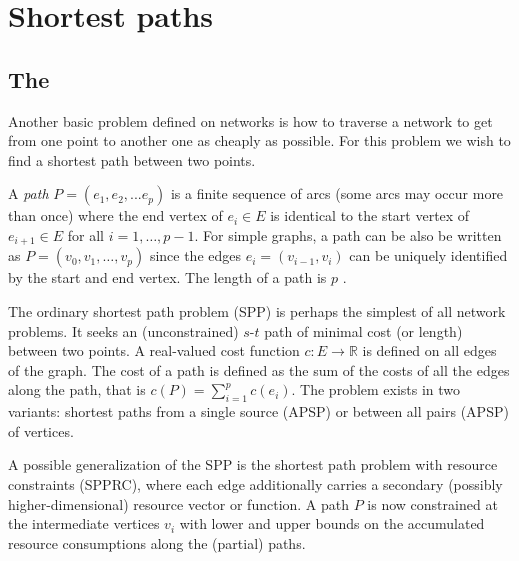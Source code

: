 \chapter{Shortest paths}\label{ch:4}

\section{The \spprc{}}
Another basic problem defined on networks is how to traverse a network to get from one point to another one as cheaply as possible. For this problem we wish to find a shortest path between two points.

\begin{definition}[path]
A \textit{path} $P = (e_1, e_2, ... e_p)$ is a finite sequence of arcs (some arcs may occur more than once) where the end vertex of $e_i \in E$ is identical to the start vertex of $e_{i+1} \in E$ for all $i=1,\dots,p-1$. For simple graphs, a path can be also be written as $P = (v_0,v_1,\dots,v_p)$ since the edges $e_i=(v_{i-1},v_i)$ can be uniquely identified by the start and end vertex. The length of a path is $p$ \cite{irnich2005shortest}.
\end{definition}


\begin{definition}[SPP]
The ordinary shortest path problem (SPP) is perhaps the simplest of all network problems. It seeks an (unconstrained) $s$-$t$ path of minimal cost (or length) between two points. A real-valued cost function $c : E \rightarrow \mathbb{R}$ is defined on all edges of the graph. The cost of a path is defined as the sum of the costs of all the edges along the path, that is $c(P)=\sum_{i=1}^p c(e_i)$. The problem exists in two variants: shortest paths from a single source (APSP) or between all pairs (APSP) of vertices.
\end{definition}

\begin{definition}[SPPRC]
A possible generalization of the SPP is the shortest path problem with resource constraints (SPPRC), where each edge additionally carries a secondary (possibly higher-dimensional) resource vector or function. A path $P$ is now constrained at the intermediate vertices $v_i$ with lower and upper bounds on the accumulated resource consumptions along the (partial) paths.
\end{definition}

